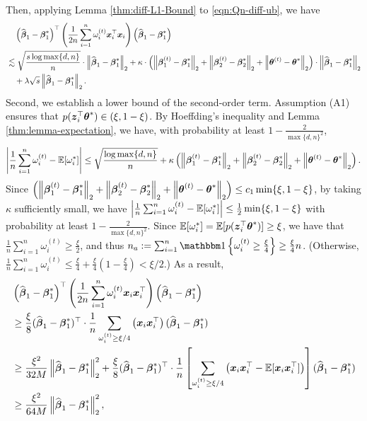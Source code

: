 Then, applying Lemma \ref{thm:diff-L1-Bound} to \eqref{eqn:Qn-diff-ub}, we have
\begin{equation}
\begin{aligned}
&\quad  \left( \widehat{\boldsymbol{\beta}}_1-\boldsymbol{\beta}_1^* \right)^\top 
\left( \frac{1}{2n}\sum_{i=1}^n\omega_i^{(t)}\boldsymbol{x}_i^\top\boldsymbol{x}_i \right)
\left( \widehat{\boldsymbol{\beta}}_1-\boldsymbol{\beta}_1^* \right) \label{eqn:Q1n-2nd-mm-ub}\\
& \lesssim \sqrt{\frac{s\log \max\{d, n\}} {n}}\cdot\left\lVert\widehat{\boldsymbol{\beta}}_1-\boldsymbol{\beta}_1^*\right\rVert_2
+ \kappa\cdot\left( \left\lVert\boldsymbol{\beta}_1^{(t)} - \boldsymbol{\beta}_1^*\right\rVert_2 + \left\lVert\boldsymbol{\beta}_2^{(t)} - \boldsymbol{\beta}_2^*\right\rVert_2 + \left\lVert\boldsymbol{\theta}^{(t)} - \boldsymbol{\theta}^*\right\rVert_2 \right)\cdot\left\lVert\widehat{\boldsymbol{\beta}}_1-\boldsymbol{\beta}_1^*\right\rVert_2  \\
&\quad + \lambda\sqrt{s}\left\lVert\widehat{\boldsymbol{\beta}}_1-\boldsymbol{\beta}_1^*\right\rVert_2. \nonumber
\end{aligned}
\end{equation}
Second, we establish a lower bound of the second-order term. 
Assumption (A1) ensures that $p(\boldsymbol{z}_i^{\top}\boldsymbol{\theta}^*) \in (\xi, 1-\xi)$. By Hoeffding's inequality and Lemma \ref{thm:lemma-expectation}, 
we have, with probability at least $1-\frac{2}{\max\{d, n\}^2}$,  \[\left\lvert\frac{1}{n}\sum_{i=1}^{n}\omega_i^{(t)}-\mathbb{E}[\omega_i^*]\right\rvert \leq \sqrt{\frac{\log \max \{d, n\}}{n}} + \kappa \left( \left\lVert\boldsymbol{\beta}_1^{(t)} - \boldsymbol{\beta}_1^*\right\rVert_2 + \left\lVert\boldsymbol{\beta}_2^{(t)} - \boldsymbol{\beta}_2^*\right\rVert_2 + \left\lVert\boldsymbol{\theta}^{(t)} - \boldsymbol{\theta}^*\right\rVert_2 \right).\]
Since $\left( \left\lVert\boldsymbol{\beta}_1^{(t)} - \boldsymbol{\beta}_1^*\right\rVert_2 + \left\lVert\boldsymbol{\beta}_2^{(t)} - \boldsymbol{\beta}_2^*\right\rVert_2 + \left\lVert\boldsymbol{\theta}^{(t)} - \boldsymbol{\theta}^*\right\rVert_2 \right) \leq c_1 \min\{\xi, 1-\xi\}$, by taking $\kappa$ sufficiently small, we have $\left\lvert\frac{1}{n}\sum_{i=1}^{n}\omega_i^{(t)}-\mathbb{E}[\omega_i^*]\right\rvert \leq \frac{1}{2} \min\{\xi, 1-\xi\}$ with probability at least $1-\frac{2}{\max\{d, n\}^2}$. Since $\mathbb{E}[\omega_i^*] = \mathbb{E}[p(\boldsymbol{z}_i^{\top}\boldsymbol{\theta}^*)] \geq \xi$,  we have that $\frac{1}{n}\sum_{i=1}^{n}\omega_i^{(t)} \geq \frac{\xi}{2}$, and thus $n_{a}:=\sum_{i=1}^n\bbone\braces{\omega_i^{(t)} \ge \frac{\xi}{4}} \ge \frac{\xi}{4}n$. (Otherwise, $\frac{1}{n}\sum_{i=1}^{n}\omega_i^{(t)} \leq \frac{\xi}{4}+ \frac{\xi}{4}(1- \frac{\xi}{4}) < \xi/2$.) %
As a result, 
\begin{align}
& \left( \widehat{\boldsymbol{\beta}}_1-\boldsymbol{\beta}_1^* \right)^\top 
\left( \frac{1}{2n}\sum_{i=1}^n\omega_i^{(t)}\boldsymbol{x}_i\boldsymbol{x}_i^\top \right)
\left( \widehat{\boldsymbol{\beta}}_1-\boldsymbol{\beta}_1^* \right) 
\nonumber\\
& \ge \frac{\xi}{8}(\widehat{\boldsymbol{\beta}}_1-\boldsymbol{\beta}_1^*)^{\top}\cdot \frac{1}{n}\sum_{\omega_i^{(t)} \geq \xi/4} \left( \boldsymbol{x}_i\boldsymbol{x}_i^\top \right) (\widehat{\boldsymbol{\beta}}_1-\boldsymbol{\beta}_1^*)\nonumber\\
& \ge \frac{\xi^2}{32M} \left\lVert\widehat{\boldsymbol{\beta}}_1-\boldsymbol{\beta}_1^*\right\rVert_2^2 +  \frac{\xi}{8}(\widehat{\boldsymbol{\beta}}_1-\boldsymbol{\beta}_1^*)^{\top}\cdot \frac{1}{n}\left[\sum_{\omega_i^{(t)} \geq \xi/4} \big(\boldsymbol{x}_i\boldsymbol{x}_i^\top-\mathbb{E}[\boldsymbol{x}_i\boldsymbol{x}_i^{\top}]\big)\right] (\widehat{\boldsymbol{\beta}}_1-\boldsymbol{\beta}_1^*) \nonumber\\
& \ge \frac{\xi^2}{64M} \left\lVert\widehat{\boldsymbol{\beta}}_1-\boldsymbol{\beta}_1^*\right\rVert_2^2, \label{eqn:Q1n-2nd-mm-lb}
\end{align}
